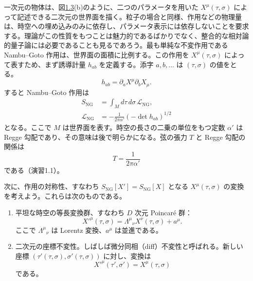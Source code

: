 一次元の物体は、図\hyperref[fig:1.3]{1.3}(b)のように、二つのパラメータを用いた $X^\mu(\tau,\sigma)$ によって記述できる二次元の世界面を描く。粒子の場合と同様、作用などの物理量は、時空への埋め込みのみに依存し、パラメータ表示には依存しないことを要求する。理論がこの性質をもつことは魅力的であるばかりでなく、整合的な相対論的量子論には必要であることも見るであろう。最も単純な不変作用である Nambu--Goto 作用は、世界面の面積に比例する。この作用を $X^\mu(\tau,\sigma)$ によって表すため、まず誘導計量 $h_{ab}$ を定義する。添字 $a,b,\ldots$ は $(\tau,\sigma)$ の値をとる。
\begin{equation}
h_{ab}=\partial_aX^\mu\partial_bX_\mu.
\tag{1.2.8}\label{eq:1.2.8}
\end{equation}
すると Nambu--Goto 作用は
\begin{align}
S_{\mathrm{NG}}&=\int_M d\tau\,d\sigma\,\mathcal L_{\mathrm{NG}},
\tag{1.2.9a}\label{eq:1.2.9a}\\
\mathcal L_{\mathrm{NG}}&=-\frac{1}{2\pi\alpha'}(-\det h_{ab})^{1/2}
\tag{1.2.9b}\label{eq:1.2.9b}
\end{align}
となる。ここで $M$ は世界面を表す。時空の長さの二乗の単位をもつ定数 $\alpha'$ は Regge 勾配であり、その意味は後で明らかになる。弦の張力 $T$ と Regge 勾配の関係は
\begin{equation}
T=\frac{1}{2\pi\alpha'}
\tag{1.2.10}\label{eq:1.2.10}
\end{equation}
である（演習1.1）。

次に、作用の対称性、すなわち $S_{\mathrm{NG}}[X']=S_{\mathrm{NG}}[X]$ となる $X^\mu(\tau,\sigma)$ の変換を考えよう。これらは次のものである。
\begin{enumerate}
\item 平坦な時空の等長変換群、すなわち $D$ 次元 Poincaré 群：
\begin{equation}
X'^\mu(\tau,\sigma)=\Lambda^\mu{}_\nu X^\nu(\tau,\sigma)+a^\mu.
\tag{1.2.11}\label{eq:1.2.11}
\end{equation}
ここで $\Lambda^\mu{}_\nu$ は Lorentz 変換、$a^\mu$ は並進である。
\item 二次元の座標不変性。しばしば微分同相（diff）不変性と呼ばれる。新しい座標 $(\tau'(\tau,\sigma),\sigma'(\tau,\sigma))$ に対し、変換は
\begin{equation}
X'^\mu(\tau',\sigma')=X^\mu(\tau,\sigma)
\tag{1.2.12}\label{eq:1.2.12}
\end{equation}
である。
\end{enumerate}

